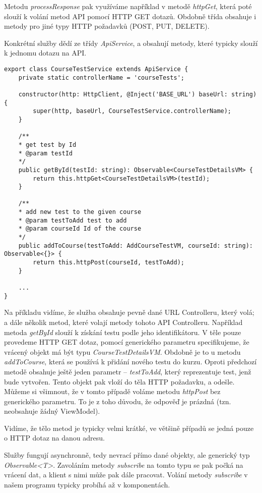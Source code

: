 Metodu \textit{processResponse} pak využíváme například v metodě \textit{httpGet}, která poté slouží k volání metod API pomocí HTTP GET dotazů. Obdobně třída obsahuje i metody pro jiné typy HTTP požadavků (POST, PUT, DELETE).

Konkrétní služby dědí ze třídy \textit{ApiService}, a obsahují metody, které typicky slouží k jednomu dotazu na API.

\begin{lstlisting}
export class CourseTestService extends ApiService {
	private static controllerName = 'courseTests';
	
	constructor(http: HttpClient, @Inject('BASE_URL') baseUrl: string) {
		super(http, baseUrl, CourseTestService.controllerName);
	}
	
	/**
	* get test by Id
	* @param testId
	*/
	public getById(testId: string): Observable<CourseTestDetailsVM> {
		return this.httpGet<CourseTestDetailsVM>(testId);
	}
	
	/**
	* add new test to the given course
	* @param testToAdd test to add
	* @param courseId Id of the course
	*/
	public addToCourse(testToAdd: AddCourseTestVM, courseId: string): Observable<{}> {
		return this.httpPost(courseId, testToAdd);
	}
	
	...
}
\end{lstlisting}

Na příkladu vidíme, že služba obsahuje pevně dané URL Controlleru, který volá; a dále několik metod, které volají metody tohoto API Controlleru.
Například metoda \textit{getById} slouží k získání testu podle jeho identifikátoru. V těle pouze provedeme HTTP GET dotaz, pomocí generického parametru specifikujeme, že vrácený objekt má být typu \textit{CourseTestDetailsVM}. 
Obdobně je to u metodu \textit{addToCourse}, která se používá k přidání nového testu do kurzu. Oproti předchozí metodě obsahuje ještě jeden parametr -- \textit{testToAdd}, který reprezentuje test, jenž bude vytvořen. Tento objekt pak vloží do těla HTTP požadavku, a odešle. 
Můžeme si všimnout, že v tomto případě voláme metodu \textit{httpPost} bez generického parametru. To je z toho důvodu, že odpověď je prázdná (tzn. neobsahuje žádný ViewModel).

Vidíme, že tělo metod je typicky velmi krátké, ve většině případů se jedná pouze o HTTP dotaz na danou adresu.

Služby fungují asynchronně, tedy nevrací přímo dané objekty, ale generický typ \textit{Observable<T>}. Zavoláním metody \textit{subscribe} na tomto typu se pak počká na vrácení dat, a klient s nimi může pak dále pracovat.
Volání metody \textit{subscribe} v našem programu typicky probíhá až v komponentách.



